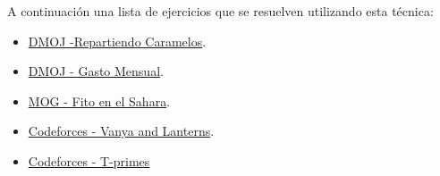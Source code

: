 A continuación una lista de ejercicios que se resuelven utilizando esta técnica:

\begin{itemize}
	\item \href{https://dmoj.uclv.edu.cu/problem/caramelos} {DMOJ -Repartiendo Caramelos}. 
    \item \href{https://dmoj.uclv.edu.cu/problem/expense} {DMOJ - Gasto Mensual}.
    \item \href{https://matcomgrader.com/problem/63/fito-en-el-sahara/} {MOG - Fito en el Sahara}.
    \item \href{https://codeforces.com/problemset/problem/492/B} {Codeforces - Vanya and Lanterns}.
    \item \href{https://codeforces.com/problemset/problem/230/B}{Codeforces - T-primes}
\end{itemize}